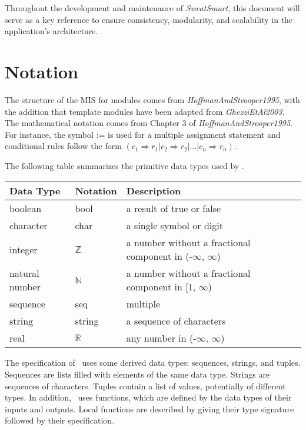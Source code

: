 \documentclass[12pt, titlepage]{article}
\begin{document}
Throughout the development and maintenance of \textit{SweatSmart}, this document will serve as a key reference to ensure consistency, modularity, and scalability in the application's architecture.


\section{Notation}
The structure of the MIS for modules comes from \textit{HoffmanAndStrooper1995},
with the addition that template modules have been adapted from
\textit{GhezziEtAl2003}.  The mathematical notation comes from Chapter 3 of
\textit{HoffmanAndStrooper1995}.  For instance, the symbol := is used for a
multiple assignment statement and conditional rules follow the form $(c_1
\Rightarrow r_1 | c_2 \Rightarrow r_2 | ... | c_n \Rightarrow r_n )$.

The following table summarizes the primitive data types used by \progname. 

\begin{center}
\renewcommand{\arraystretch}{1.2}
\noindent 
\begin{tabular}{l l p{7.5cm}} 
\toprule 
\textbf{Data Type} & \textbf{Notation} & \textbf{Description}\\ 
\midrule
boolean & bool & a result of true or false\\
character & char & a single symbol or digit\\
integer & $\mathbb{Z}$ & a number without a fractional component in (-$\infty$, $\infty$) \\
natural number & $\mathbb{N}$ & a number without a fractional component in [1, $\infty$) \\
sequence & seq & multiple \\
string & string & a sequence of characters \\
real & $\mathbb{R}$ & any number in (-$\infty$, $\infty$)\\
\bottomrule
\end{tabular} 
\end{center}

\noindent
The specification of \progname \ uses some derived data types: sequences, strings, and
tuples. Sequences are lists filled with elements of the same data type. Strings
are sequences of characters. Tuples contain a list of values, potentially of
different types. In addition, \progname \ uses functions, which
are defined by the data types of their inputs and outputs. Local functions are
described by giving their type signature followed by their specification.
\end{document}
